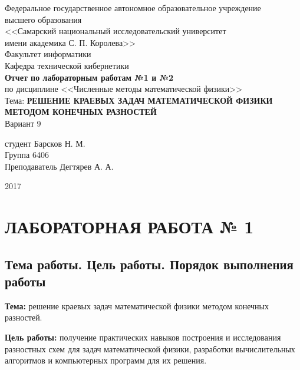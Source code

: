 \documentclass[a4paper,12pt,russian, fleqn]{extreport}
\begin{document}
	\begin{center}
		Федеральное государственное автономное образовательное учреждение \\
		высшего образования \\
		<<Самарский национальный исследовательский университет \\
		имени академика С. П. Королева>>\\
		\vspace{2cm}
		Факультет информатики \\
		\vspace{1cm}
		Кафедра технической кибернетики \\
		\vspace{3cm}
		\textbf{Отчет по лабораторным работам №1 и №2} \\
		по дисциплине <<Численные методы математической физики>> \\
		\vspace{1cm}
		Тема: \textbf{РЕШЕНИЕ КРАЕВЫХ ЗАДАЧ МАТЕМАТИЧЕСКОЙ ФИЗИКИ МЕТОДОМ КОНЕЧНЫХ РАЗНОСТЕЙ}\\
		\vspace{1cm}
		Вариант 9
	\end{center}

	 студент Барсков Н. М. \\
	Группа 6406\\
	Преподаватель Дегтярев А. А.
	\vfill
	\begin{center}
		2017
	\end{center}
	\thispagestyle{empty}
	\newpage
	\tableofcontents
	
	\chapter{ЛАБОРАТОРНАЯ РАБОТА № 1}
	\section{Тема работы. Цель работы. Порядок выполнения работы}
	\textbf{Тема:} решение краевых задач математической физики методом конечных разностей.
	
	\textbf{Цель работы:} получение практических навыков построения и исследования разностных схем для задач математической физики, разработки вычислительных алгоритмов и компьютерных программ для их решения.
	
\end{document}
